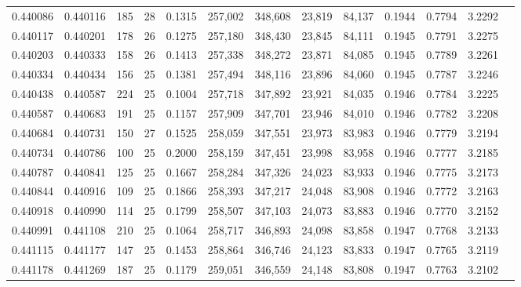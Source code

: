 \begin{tabular}{rrrrrrrrrrrrr}
0.440086 & 0.440116 & 185 &  28 &                                     0.1315 & 257,002 & 348,608 &  23,819 &  84,137 & 0.1944 & 0.7794 & 3.2292 \\
0.440117 & 0.440201 & 178 &  26 &                                     0.1275 & 257,180 & 348,430 &  23,845 &  84,111 & 0.1945 & 0.7791 & 3.2275 \\
0.440203 & 0.440333 & 158 &  26 &                                     0.1413 & 257,338 & 348,272 &  23,871 &  84,085 & 0.1945 & 0.7789 & 3.2261 \\
0.440334 & 0.440434 & 156 &  25 &                                     0.1381 & 257,494 & 348,116 &  23,896 &  84,060 & 0.1945 & 0.7787 & 3.2246 \\
0.440438 & 0.440587 & 224 &  25 &                                     0.1004 & 257,718 & 347,892 &  23,921 &  84,035 & 0.1946 & 0.7784 & 3.2225 \\
0.440587 & 0.440683 & 191 &  25 &                                     0.1157 & 257,909 & 347,701 &  23,946 &  84,010 & 0.1946 & 0.7782 & 3.2208 \\
0.440684 & 0.440731 & 150 &  27 &                                     0.1525 & 258,059 & 347,551 &  23,973 &  83,983 & 0.1946 & 0.7779 & 3.2194 \\
0.440734 & 0.440786 & 100 &  25 &                                     0.2000 & 258,159 & 347,451 &  23,998 &  83,958 & 0.1946 & 0.7777 & 3.2185 \\
0.440787 & 0.440841 & 125 &  25 &                                     0.1667 & 258,284 & 347,326 &  24,023 &  83,933 & 0.1946 & 0.7775 & 3.2173 \\
0.440844 & 0.440916 & 109 &  25 &                                     0.1866 & 258,393 & 347,217 &  24,048 &  83,908 & 0.1946 & 0.7772 & 3.2163 \\
0.440918 & 0.440990 & 114 &  25 &                                     0.1799 & 258,507 & 347,103 &  24,073 &  83,883 & 0.1946 & 0.7770 & 3.2152 \\
0.440991 & 0.441108 & 210 &  25 &                                     0.1064 & 258,717 & 346,893 &  24,098 &  83,858 & 0.1947 & 0.7768 & 3.2133 \\
0.441115 & 0.441177 & 147 &  25 &                                     0.1453 & 258,864 & 346,746 &  24,123 &  83,833 & 0.1947 & 0.7765 & 3.2119 \\
0.441178 & 0.441269 & 187 &  25 &                                     0.1179 & 259,051 & 346,559 &  24,148 &  83,808 & 0.1947 & 0.7763 & 3.2102 \\

\end{tabular}
